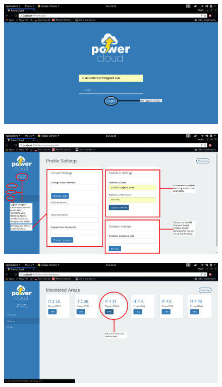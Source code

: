 \documentclass[a4paper,10pt]{article}
\begin{document}
				\begin{figure}[H]
							\includegraphics[scale=0.3]{images/login2.png}
				\end{figure}
				
				\begin{figure}[H]
							\includegraphics[scale=0.3]{images/profile.png}
				\end{figure}
				
				\begin{figure}[H]
							\includegraphics[scale=0.3]{images/view.png}
				\end{figure}
				
\end{document}
